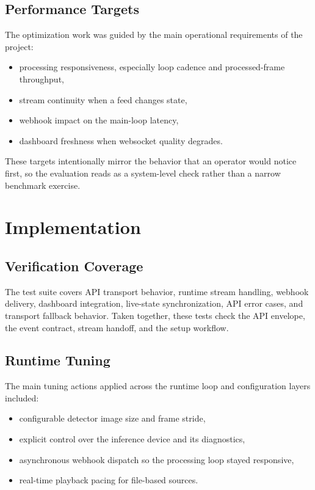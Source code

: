 \subsection{Performance Targets}
The optimization work was guided by the main operational requirements of the project:
\begin{itemize}
	\item processing responsiveness, especially loop cadence and processed-frame throughput,
	\item stream continuity when a feed changes state,
	\item webhook impact on the main-loop latency,
	\item dashboard freshness when websocket quality degrades.
\end{itemize}

These targets intentionally mirror the behavior that an operator would notice first, so the evaluation reads as a system-level check rather than a narrow benchmark exercise.

\section{Implementation}
\subsection{Verification Coverage}
The test suite covers API transport behavior, runtime stream handling, webhook delivery, dashboard integration, live-state synchronization, API error cases, and transport fallback behavior.
Taken together, these tests check the API envelope, the event contract, stream handoff, and the setup workflow.

\subsection{Runtime Tuning}
The main tuning actions applied across the runtime loop and configuration layers included:
\begin{itemize}
	\item configurable detector image size and frame stride,
	\item explicit control over the inference device and its diagnostics,
	\item asynchronous webhook dispatch so the processing loop stayed responsive,
	\item real-time playback pacing for file-based sources.
\end{itemize}

